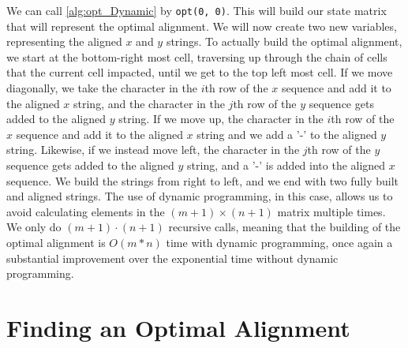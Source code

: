 \documentclass{article}
\renewcommand{\_}{\ifincsname_\else\legacyunderscore\fi}
\begin{document}
        We can call \ref{alg:opt_Dynamic} by \texttt{opt(0, 0)}. This will build our state matrix that will represent the optimal alignment. We will now create two new variables, representing the aligned $x$ and $y$ strings. To actually build the optimal alignment, we start at the bottom-right most cell, traversing up through the chain of cells that the current cell impacted, until we get to the top left most cell. If we move diagonally, we take the character in the $i$th row of the $x$ sequence and add it to the aligned $x$ string, and the character in the $j$th row of the $y$ sequence gets added to the aligned $y$ string. If we move up, the character in the $i$th row of the $x$ sequence and add it to the aligned $x$ string and we add a '-' to the aligned $y$ string. Likewise, if we instead move left, the character in the $j$th row of the $y$ sequence gets added to the aligned $y$ string, and a '-' is added into the aligned $x$ sequence. We build the strings from right to left, and we end with two fully built and aligned strings. The use of dynamic programming, in this case, allows us to avoid calculating elements in the $(m+1)\times(n+1)$ matrix multiple times. We only do $(m+1)\cdot(n+1)$ recursive calls, meaning that the building of the optimal alignment is $O(m*n)$ time with dynamic programming, once again a substantial improvement over the exponential time without dynamic programming. 
    \section*{Finding an Optimal Alignment}

    \printbibliography
\end{document}
